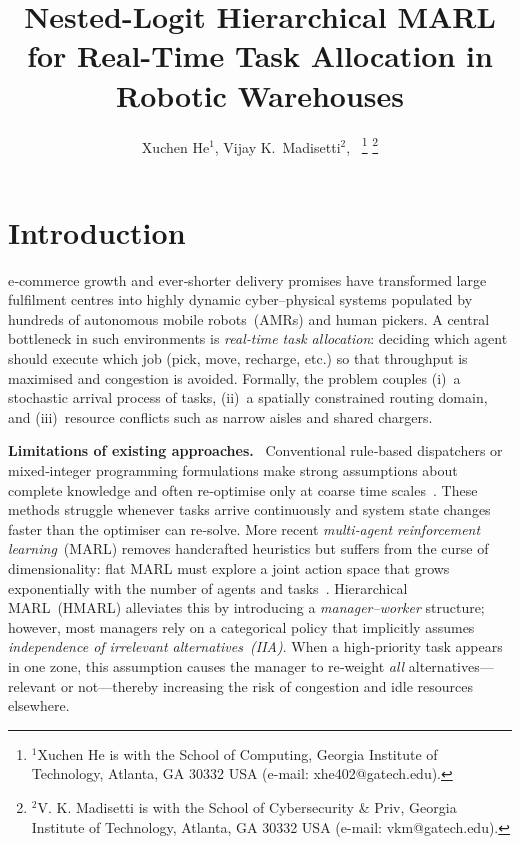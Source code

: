 \documentclass[journal]{IEEEtran}
\begin{document}
\title{Nested-Logit Hierarchical MARL for Real-Time Task Allocation in Robotic Warehouses}
\author{%
  Xuchen He$^{1}$,
  Vijay K.~Madisetti$^{2}$,~%
  \thanks{$^{1}$Xuchen He is with the School of Computing,
          Georgia Institute of Technology, Atlanta, GA 30332 USA
          (e-mail: xhe402@gatech.edu).}%
  \thanks{$^{2}$V. K. Madisetti is with the School of Cybersecurity \& Priv,
          Georgia Institute of Technology, Atlanta, GA 30332 USA
          (e-mail: vkm@gatech.edu).}%
}
\maketitle

\section{Introduction}
 e‑commerce growth and ever‑shorter delivery promises have transformed large fulfilment centres into highly dynamic cyber–physical systems populated by hundreds of autonomous mobile robots (AMRs) and human pickers.%
A central bottleneck in such environments is \emph{real‑time task allocation}: deciding which agent should execute which job (pick, move, recharge, etc.) so that throughput is maximised and congestion is avoided.%
Formally, the problem couples (i) a stochastic arrival process of tasks, (ii) a spatially constrained routing domain, and (iii) resource conflicts such as narrow aisles and shared chargers.

\vspace{2pt}
\textbf{Limitations of existing approaches.} %
Conventional rule‑based dispatchers or mixed‑integer programming formulations make strong assumptions about complete knowledge and often re‑optimise only at coarse time scales \citep{ratliff1983sshape,de_koster1997optimal}.%
These methods struggle whenever tasks arrive continuously and system state changes faster than the optimiser can re‑solve.%
More recent \emph{multi‑agent reinforcement learning} (MARL) removes handcrafted heuristics but suffers from the curse of dimensionality: flat MARL must explore a joint action space that grows exponentially with the number of agents and tasks \citep{alam2024dqn}.%
Hierarchical MARL (HMARL) alleviates this by introducing a \emph{manager–worker} structure; however, most managers rely on a categorical policy that implicitly assumes \emph{independence of irrelevant alternatives (IIA)}.%
When a high‑priority task appears in one zone, this assumption causes the manager to re‑weight \emph{all} alternatives—relevant or not—thereby increasing the risk of congestion and idle resources elsewhere.
\end{document}
